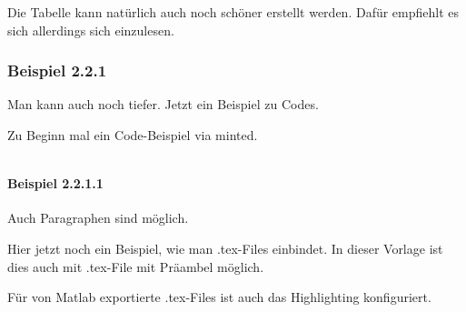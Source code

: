Die Tabelle kann natürlich auch noch schöner erstellt werden. Dafür empfiehlt es sich allerdings sich einzulesen.

\subsubsection{Beispiel 2.2.1}

Man kann auch noch tiefer.
Jetzt ein Beispiel zu Codes.

Zu Beginn mal ein Code-Beispiel via minted.

\inputminted{systemverilog}{resources/code/systemVerilogDemo.sv}

\paragraph{Beispiel 2.2.1.1}

Auch Paragraphen sind möglich.

Hier jetzt noch ein Beispiel, wie man .tex-Files einbindet.
In dieser Vorlage ist dies auch mit .tex-File mit Präambel möglich.



Für von Matlab exportierte .tex-Files ist auch das Highlighting konfiguriert.

\newpage                    %
